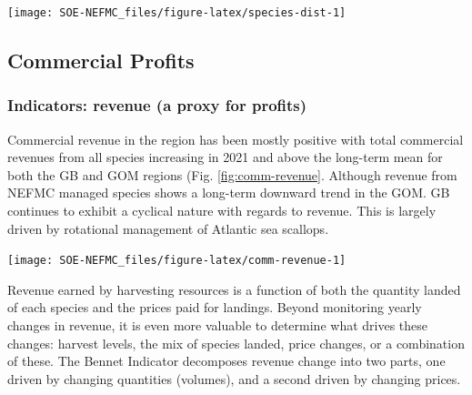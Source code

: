 \documentclass[
  10pt,
]{article}
\let\origfigure\figure
\let\endorigfigure\endfigure
\renewenvironment{figure}[1][2] {
    \expandafter\origfigure\expandafter[H]
} {
    \endorigfigure
}
\begin{document}
\begin{figure}

{\centering \texttt{[image: SOE-NEFMC\_files/figure-latex/species-dist-1]} 

}

\caption{Aggregate species distribution metrics for species in the Northeast Large Marine Ecosystem.}\label{fig:species-dist}
\end{figure}

\hypertarget{commercial-profits}{%
\subsection{Commercial Profits}\label{commercial-profits}}

\hypertarget{indicators-revenue-a-proxy-for-profits}{%
\subsubsection{Indicators: revenue (a proxy for profits)}\label{indicators-revenue-a-proxy-for-profits}}

Commercial revenue in the region has been mostly positive with total commercial revenues from all species increasing in 2021 and above the long-term mean for both the GB and GOM regions (Fig. \ref{fig:comm-revenue}. Although revenue from NEFMC managed species shows a long-term downward trend in the GOM. GB continues to exhibit a cyclical nature with regards to revenue. This is largely driven by rotational management of Atlantic sea scallops.

\begin{figure}

{\centering \texttt{[image: SOE-NEFMC\_files/figure-latex/comm-revenue-1]} 

}

\caption{Revenue through 2022 for the New England region: total (black) and from NEFMC managed species (red).}\label{fig:comm-revenue}
\end{figure}

Revenue earned by harvesting resources is a function of both the quantity landed of each species and the prices paid for landings. Beyond monitoring yearly changes in revenue, it is even more valuable to determine what drives these changes: harvest levels, the mix of species landed, price changes, or a combination of these. The Bennet Indicator decomposes revenue change into two parts, one driven by changing quantities (volumes), and a second driven by changing prices.
\end{document}
